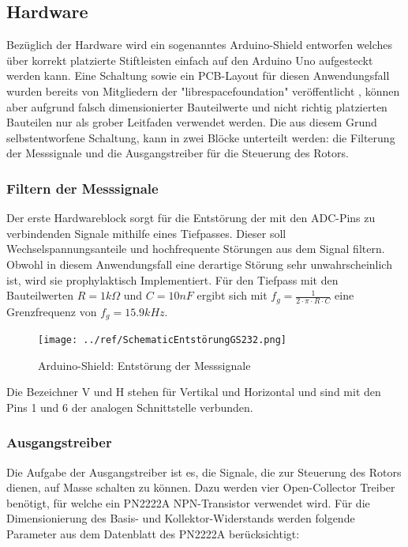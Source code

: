 \subsection{Hardware}
\label{subsec:hardware}
Bezüglich der Hardware wird ein sogenanntes Arduino-Shield entworfen welches über korrekt platzierte Stiftleisten einfach auf den Arduino Uno aufgesteckt werden kann. Eine Schaltung sowie ein PCB-Layout für diesen Anwendungsfall wurden bereits von Mitgliedern der "librespacefoundation"  veröffentlicht \cite{noauthor_librespacefoundation_nodate}, können aber aufgrund falsch dimensionierter Bauteilwerte und nicht richtig platzierten Bauteilen nur als grober Leitfaden verwendet werden. Die aus diesem Grund selbstentworfene Schaltung, kann in zwei Blöcke unterteilt werden: die Filterung der Messsignale und die Ausgangstreiber für die Steuerung des Rotors.  

\subsubsection{Filtern der Messsignale}
Der erste Hardwareblock sorgt für die Entstörung der mit den ADC-Pins zu verbindenden Signale mithilfe eines Tiefpasses. Dieser soll Wechselspannungsanteile und hochfrequente Störungen aus dem Signal filtern. Obwohl in diesem Anwendungsfall eine derartige Störung sehr unwahrscheinlich ist, wird sie prophylaktisch Implementiert. Für den Tiefpass mit den Bauteilwerten $R=1k\Omega $ und $C=10nF$ ergibt sich mit ${f}_{g}=\frac{1}{2\cdot \pi \cdot R\cdot C}$ eine Grenzfrequenz von ${f}_{g}=15.9kHz$.

\begin{figure}[H]
	\centering
	\texttt{[image: ../ref/SchematicEntstörungGS232.png]}
	\label{fig:Schaltung_Entstörung_Arduino-Shield}
	\caption{Arduino-Shield: Entstörung der Messsignale}
\end{figure}

Die Bezeichner V und H stehen für Vertikal und Horizontal und sind mit den Pins 1 und 6 der analogen Schnittstelle verbunden.

\subsubsection{Ausgangstreiber}
Die Aufgabe der Ausgangstreiber ist es, die Signale, die zur Steuerung des Rotors dienen, auf Masse schalten zu können. Dazu werden vier Open-Collector Treiber benötigt, für welche ein PN2222A NPN-Transistor verwendet wird. Für die Dimensionierung des Basis- und Kollektor-Widerstands werden folgende Parameter aus dem Datenblatt des PN2222A \cite{noauthor_pn2222a_nodate} berücksichtigt: 

